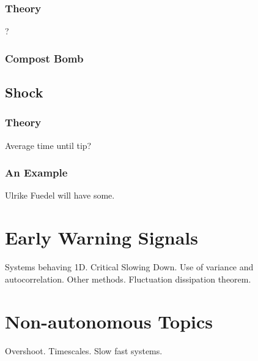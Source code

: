 \subsubsection{Theory}
?
\subsubsection{Compost Bomb}
\subsection{Shock}
\subsubsection{Theory}
Average time until tip?
\subsubsection{An Example}
Ulrike Fuedel will have some.


\section{Early Warning Signals}
Systems behaving 1D. Critical Slowing Down. Use of variance and
autocorrelation. Other methods. Fluctuation dissipation theorem.


\section{Non-autonomous Topics}
Overshoot. Timescales. Slow fast systems.